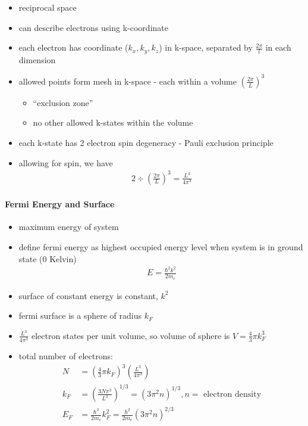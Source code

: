 \documentclass[a4paper,11pt,normalem]{article}
\begin{document}
\begin{itemize}
    \item reciprocal space
    \item can describe electrons using k-coordinate
    \item each electron has coordinate (\(k_x,k_y,k_z\)) in k-space, separated by \(\frac{2\pi}{l}\) in each dimension
    \item allowed points form mesh in k-space - each within a volume \(\left(\frac{2\pi}{L}\right)^3\)
        \begin{itemize}
            \item ``exclusion zone''
            \item no other allowed k-states within the volume
        \end{itemize}
    \item each k-state has 2 electron spin degeneracy - Pauli exclusion principle
    \item allowing for spin, we have
        \begin{align*}
            2\div\left(\frac{2\pi}{L}\right)^3 = \frac{L^3}{4\pi^3}
        \end{align*}
\end{itemize}

\paragraph{Fermi Energy and Surface}

\begin{itemize}
    \item maximum energy of system
    \item define fermi energy as highest occupied energy level when system is in ground state (0 Kelvin)
        \begin{align*}
            E = \frac{\hbar^2k^2}{2m_e}
        \end{align*}
    \item surface of constant energy is constant, \(k^2\)
    \item fermi surface is a sphere of radius \(k_F\)
    \item \(\frac{L^3}{4\pi^3}\) electron states per unit volume, so volume of sphere is \(V = \frac{4}{3}\pi k_F^3\)
    \item total number of electrons:
        \begin{align*}
            N &= \left(\frac{4}{3}\pi k_F\right)^3\left(\frac{L^3}{4\pi^3}\right) \\
            k_F &= \left(\frac{3N\pi^2}{L^3}\right)^{1/3} = (3\pi^2n)^{1/3}, n = \text{ electron density}\\
            E_F &= \frac{\hbar^2}{2m_e}k_F^2 = \frac{\hbar^2}{2m_e}(3\pi^2n)^{2/3}\\
        \end{align*}
\end{itemize}
\end{document}
